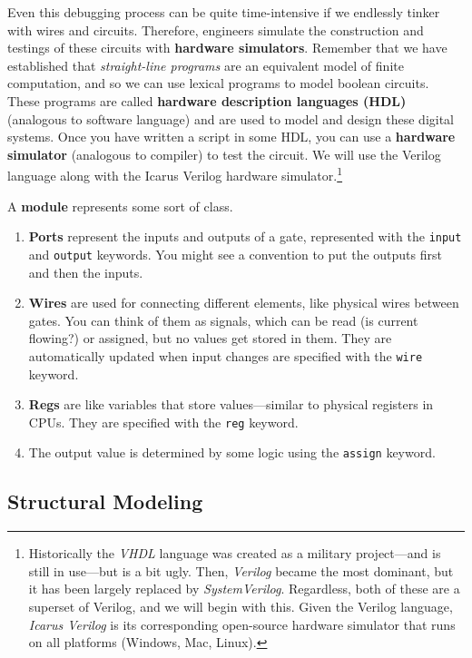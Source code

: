   Even this debugging process can be quite time-intensive if we endlessly tinker with wires and circuits. Therefore, engineers simulate the construction and testings of these circuits with \textbf{hardware simulators}. Remember that we have established that \textit{straight-line programs} are an equivalent model of finite computation, and so we can use lexical programs to model boolean circuits. These programs are called \textbf{hardware description languages (HDL)} (analogous to software language) and are used to model and design these digital systems. Once you have written a script in some HDL, you can use a \textbf{hardware simulator} (analogous to compiler) to test the circuit. We will use the Verilog language along with the Icarus Verilog hardware simulator.\footnote{Historically the \textit{VHDL} language was created as a military project---and is still in use---but is a bit ugly.  Then, \textit{Verilog} became the most dominant, but it has been largely replaced by \textit{SystemVerilog}. Regardless, both of these are a superset of Verilog, and we will begin with this. Given the Verilog language, \textit{Icarus Verilog} is its corresponding open-source hardware simulator that runs on all platforms (Windows, Mac, Linux).}

  \begin{definition}[Module]
    A \textbf{module} represents some sort of class. 
    \begin{enumerate}
      \item \textbf{Ports} represent the inputs and outputs of a gate, represented with the \texttt{input} and \texttt{output} keywords. You might see a convention to put the outputs first and then the inputs. 
      \item \textbf{Wires} are used for connecting different elements, like physical wires between gates. You can think of them as signals, which can be read (is current flowing?) or assigned, but no values get stored in them. They are automatically updated when input changes are specified with the \texttt{wire} keyword. 
      \item \textbf{Regs} are like variables that store values---similar to physical registers in CPUs. They are specified with the \texttt{reg} keyword. 
      \item The output value is determined by some logic using the \texttt{assign} keyword. 
    \end{enumerate}
  \end{definition}

\subsection{Structural Modeling}

